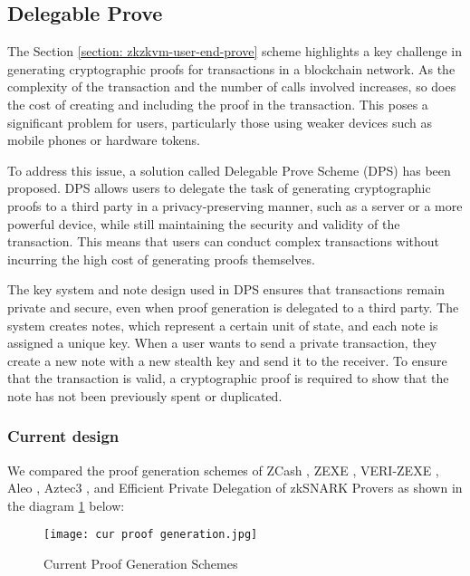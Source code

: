 \subsection{Delegable Prove}\label{section: zkzkvm-delegable-prove}

The Section \ref{section: zkzkvm-user-end-prove} scheme highlights a key challenge in generating cryptographic proofs for transactions in a blockchain network. As the complexity of the transaction and the number of calls involved increases, so does the cost of creating and including the proof in the transaction. This poses a significant problem for users, particularly those using weaker devices such as mobile phones or hardware tokens.

To address this issue, a solution called Delegable Prove Scheme (DPS) has been proposed. DPS allows users to delegate the task of generating cryptographic proofs to a third party in a privacy-preserving manner, such as a server or a more powerful device, while still maintaining the security and validity of the transaction. This means that users can conduct complex transactions without incurring the high cost of generating proofs themselves.

The key system and note design used in DPS ensures that transactions remain private and secure, even when proof generation is delegated to a third party. The system creates notes, which represent a certain unit of state, and each note is assigned a unique key. When a user wants to send a private transaction, they create a new note with a new stealth key and send it to the receiver. To ensure that the transaction is valid, a cryptographic proof is required to show that the note has not been previously spent or duplicated.

\subsubsection{Current design}

We compared the proof generation schemes of ZCash \cite{website:zcash-nu5}, ZEXE \cite{cryptoeprint:2018/962}, VERI-ZEXE \cite{cryptoeprint:2022/802}, Aleo \cite{website:aleo-vm}, Aztec3 \cite{website:Aztec3}, and Efficient Private Delegation of zkSNARK Provers \cite{website:epdzp} as shown in the diagram \ref{fig:cur_proof_generation} below:
\begin{figure}[!ht]
    \centering
    \texttt{[image: cur proof generation.jpg]}
    \caption{Current Proof Generation Schemes}
    \label{fig:cur_proof_generation}
\end{figure}

